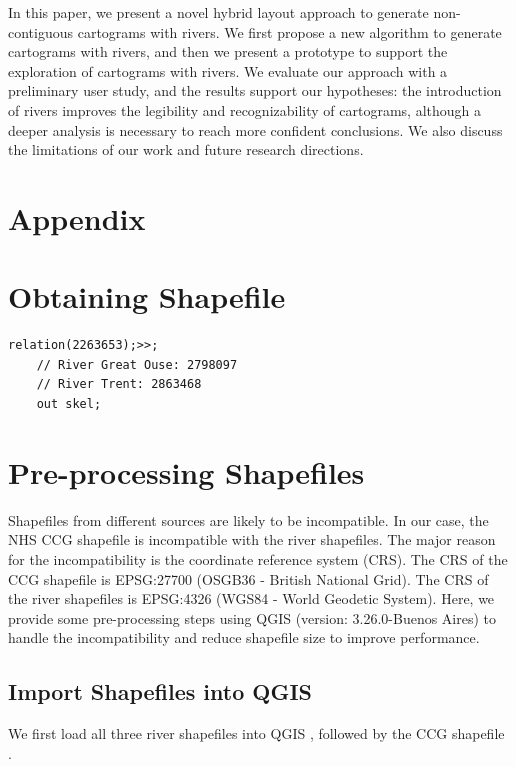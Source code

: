 \documentclass[Afour,sagev,times]{sagej}
\begin{document}
In this paper, we present a novel hybrid layout approach to generate non-contiguous cartograms with rivers. We first propose a new algorithm to generate cartograms with rivers, and then we present a prototype to support the exploration of cartograms with rivers. We evaluate our approach with a preliminary user study, and the results support our hypotheses: the introduction of rivers improves the legibility and recognizability of cartograms, although a deeper analysis is necessary to reach more confident conclusions. We also discuss the limitations of our work and future research directions.




\cleardoublepage

\section{Appendix}
\appendix

\section{Obtaining Shapefile}
\label{obtaining-shapefile}
\begin{lstlisting}[caption={The query that downloads the shapefile of River Thames from OpenStreetMap via the Overpass Turbo API.}, label={overpass},captionpos=b]
    relation(2263653);>>;
    // River Great Ouse: 2798097
    // River Trent: 2863468
    out skel;
\end{lstlisting}
\section{Pre-processing Shapefiles}
\label{app:pre-processing}
Shapefiles from different sources are likely to be incompatible. In our case, the NHS CCG shapefile is incompatible with the river shapefiles. The major reason for the incompatibility is the coordinate reference system (CRS). The CRS of the CCG shapefile is EPSG:27700 (OSGB36 - British National Grid). The CRS of the river shapefiles is EPSG:4326 (WGS84 - World Geodetic System). Here, we provide some pre-processing steps using QGIS (version: 3.26.0-Buenos Aires) \cite{qgisWelcome} to handle the incompatibility and reduce shapefile size to improve performance.

\subsection{Import Shapefiles into QGIS}
We first load all three river shapefiles into QGIS , followed by the CCG shapefile .
\end{document}
